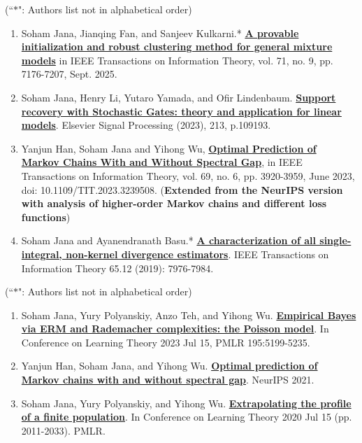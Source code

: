 \documentclass[letterpaper,12pt,oneside]{article}
\theoremstyle{definition}
\begin{document}
			 (``$\ast$": Authors list not in alphabetical order)
			
			\begin{enumerate}
				\item Soham Jana, Jianqing Fan, and Sanjeev Kulkarni.* {\bf \href{https://ieeexplore.ieee.org/document/11069307}{A provable initialization and robust clustering method for general mixture models}} in IEEE Transactions on Information Theory, vol. 71, no. 9, pp. 7176-7207, Sept. 2025.
				
				\item Soham Jana, Henry Li, Yutaro Yamada, and Ofir Lindenbaum. {\bf \href{https://www.sciencedirect.com/science/article/abs/pii/S0165168423002670}{\bf Support recovery with Stochastic Gates: theory and application for linear models}}. Elsevier Signal Processing (2023), 213, p.109193.
				
				\item Yanjun Han, Soham Jana and Yihong Wu, \href{https://ieeexplore.ieee.org/abstract/document/10028667}{\bf Optimal Prediction of Markov Chains With and Without Spectral Gap}, in IEEE Transactions on Information Theory, vol. 69, no. 6, pp. 3920-3959, June 2023, doi: 10.1109/TIT.2023.3239508. (\textbf{Extended from the NeurIPS version with analysis of higher-order Markov chains and different loss functions})
				
				\item Soham Jana and Ayanendranath Basu.* \href{https://janasoham.github.io/files/bregman_charac.pdf}{\bf A characterization of all single-integral, non-kernel divergence estimators}. IEEE Transactions on Information Theory 65.12 (2019): 7976-7984.
				
			\end{enumerate}
			
			 (``$\ast$": Authors list not in alphabetical order)
			
			\begin{enumerate}
				\item Soham Jana, Yury Polyanskiy, Anzo Teh, and Yihong Wu. \href{https://arxiv.org/abs/2307.02070}{\bf Empirical Bayes via ERM and Rademacher complexities: the Poisson model}. In Conference on Learning Theory 2023 Jul 15, PMLR 195:5199-5235.
				
				\item Yanjun Han, Soham Jana, and Yihong Wu. \href{https://arxiv.org/abs/2106.13947}{\bf Optimal prediction of Markov chains with and without spectral gap}. NeurIPS 2021.
				
				\item Soham Jana, Yury Polyanskiy, and Yihong Wu. \href{https://arxiv.org/abs/2005.10561}{\bf Extrapolating the profile of a finite population}. In Conference on Learning Theory 2020 Jul 15 (pp. 2011-2033). PMLR.
			\end{enumerate}
			
\end{document}
